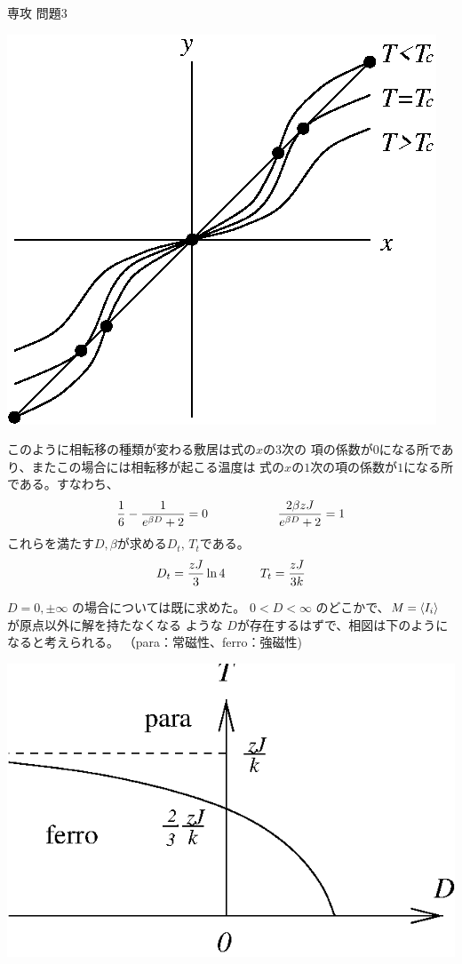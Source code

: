\documentclass[fleqn]{jbook}
\begin{document}
\begin{answer}{専攻 問題3}{}
\begin{subanswers}
\begin{center}
    \mbox{\includegraphics[clip]{1993phy3-2.eps}}
  \end{center}
%
  このように相転移の種類が変わる敷居は式の$x$の$3$次の
  項の係数が$0$になる所であり、またこの場合には相転移が起こる温度は
  式の$x$の$1$次の項の係数が$1$になる所である。すなわち、
%
  \[ \frac{1}{6}-\frac{1}{e^{\beta D}+2} = 0 \hspace{20mm}%
     \frac{2\beta zJ}{e^{\beta D}+2} = 1 \]
%
  これらを満たす$D,\beta$が求める$D_t,\,T_t$である。
%
  \[ D_t = \frac{zJ}{3}\ln4  \hspace{10mm}%
     T_t = \frac{zJ}{3k} \]
%


\SubAnswer
  $D=0,\pm\infty$ の場合については既に求めた。
  $0<D<\infty$ のどこかで、$M=\langle{I_i}\rangle$ が原点以外に解を持たなくなる
  ような $D$が存在するはずで、相図は下のようになると考えられる。
  （para：常磁性、ferro：強磁性)
%
  \begin{center}
    \mbox{\includegraphics[clip]{1993phy3-3.eps}}
  \end{center}

\end{subanswers}
\end{answer}
\end{document}
